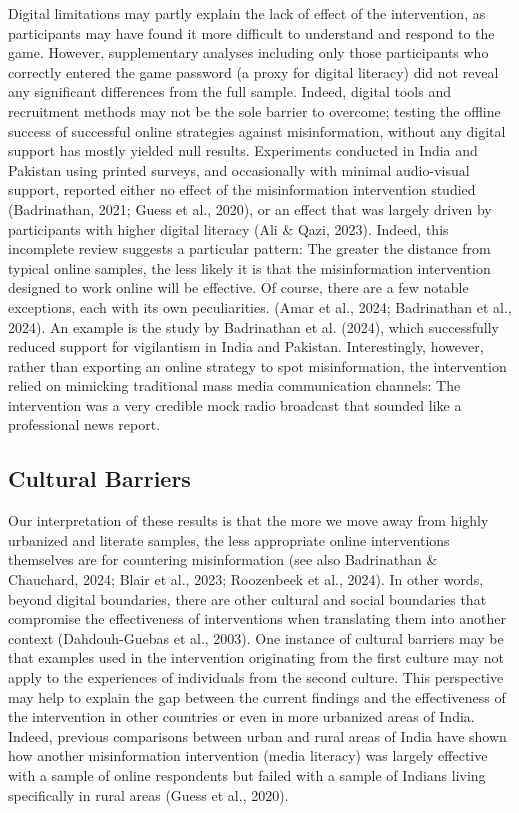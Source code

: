 \documentclass[authordate, reflection]{jote-new-article}
\begin{document}
	Digital limitations may partly explain the lack of effect of the intervention, as participants may have found it more difficult to understand and respond to the game. However, supplementary analyses including only those participants who correctly entered the game password (a proxy for digital literacy) did not reveal any significant differences from the full sample. Indeed, digital tools and recruitment methods may not be the sole barrier to overcome; testing the offline success of successful online strategies against misinformation, without any digital support has mostly yielded null results. Experiments conducted in India and Pakistan using printed surveys, and occasionally with minimal audio-visual support, reported either no effect of the misinformation intervention studied (Badrinathan, 2021; Guess et al., 2020), or an effect that was largely driven by participants with higher digital literacy (Ali \& Qazi, 2023). Indeed, this incomplete review suggests a particular pattern: The greater the distance from typical online samples, the less likely it is that the misinformation intervention designed to work online will be effective. Of course, there are a few notable exceptions, each with its own peculiarities. (Amar et al., 2024; Badrinathan et al., 2024). An example is the study by Badrinathan et al. (2024), which successfully reduced support for vigilantism in India and Pakistan. Interestingly, however, rather than exporting an online strategy to spot misinformation, the intervention relied on mimicking traditional mass media communication channels: The intervention was a very credible mock radio broadcast that sounded like a professional news report.



	\subsection{Cultural Barriers}



	 Our interpretation of these results is that the more we move away from highly urbanized and literate samples, the less appropriate online interventions themselves are for countering misinformation (see also Badrinathan \& Chauchard, 2024; Blair et al., 2023; Roozenbeek et al., 2024). In other words, beyond digital boundaries, there are other cultural and social boundaries that compromise the effectiveness of interventions when translating them into another context (Dahdouh-Guebas et al., 2003). One instance of cultural barriers may be that examples used in the intervention originating from the first culture may not apply to the experiences of individuals from the second culture. This perspective may help to explain the gap between the current findings and the effectiveness of the intervention in other countries or even in more urbanized areas of India. Indeed, previous comparisons between urban and rural areas of India have shown how another misinformation intervention (media literacy) was largely effective with a sample of online respondents but failed with a sample of Indians living specifically in rural areas (Guess et al., 2020).
\end{document}
